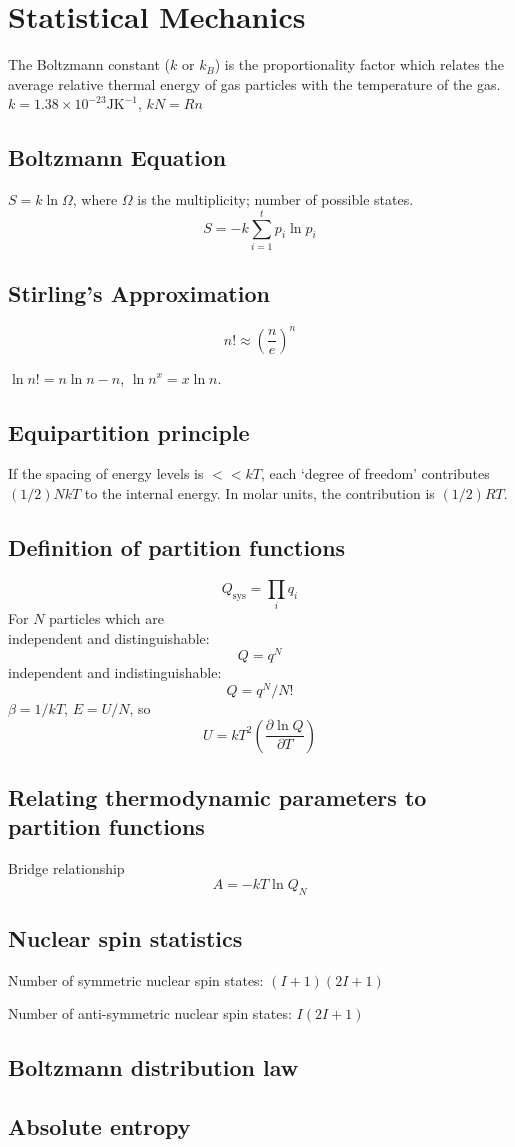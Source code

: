 \columnbreak
\section{Statistical Mechanics}
The Boltzmann constant ($k$ or $k_B$) is the proportionality factor which relates the average relative thermal energy 
of gas particles with the temperature of the gas.
$k = 1.38 \times 10^{-23} \mathrm{J} \mathrm{K}^{-1}$, $kN = Rn$

\subsection*{Boltzmann Equation}
$S = k \ln \Omega$, where $\Omega$ is the multiplicity; number of possible states.
\begin{equation*}
    S = -k \sum_{i = 1}^{t}p_i \ln p_i
\end{equation*}

\subsection*{Stirling's Approximation}
\begin{equation*}
    n! \approx \left(\frac{n}{e}\right)^n
\end{equation*}

$\ln n! = n \ln n - n$, $\ln n^x = x \ln n$.

\subsection*{Equipartition principle}
If the spacing of energy levels is $<< kT$, each `degree of freedom' contributes $(1/2)NkT$ to the internal energy. 
In molar units, the contribution is $(1/2)RT$.

\subsection*{Definition of partition functions}
\begin{equation*}
    Q_{\mathrm{sys}} = \prod_{i} q_i
\end{equation*}
For $N$ particles which are \\
independent and distinguishable: $$Q = q^N$$independent and indistinguishable: $$Q = q^N/N!$$
$\beta = 1/kT$, $E = U/N$, so $$U = kT^2\left(\frac{\partial \ln Q}{\partial T}\right)$$

\subsection*{Relating thermodynamic parameters to partition functions}
Bridge relationship
\begin{equation*}
    A = -kT \ln Q_N
\end{equation*}
\subsection*{Nuclear spin statistics}
Number of symmetric nuclear spin states: $(I + 1)(2I + 1)$

Number of anti-symmetric nuclear spin states: $I(2I + 1)$

\subsection*{Boltzmann distribution law}
\subsection*{Absolute entropy}
\columnbreak